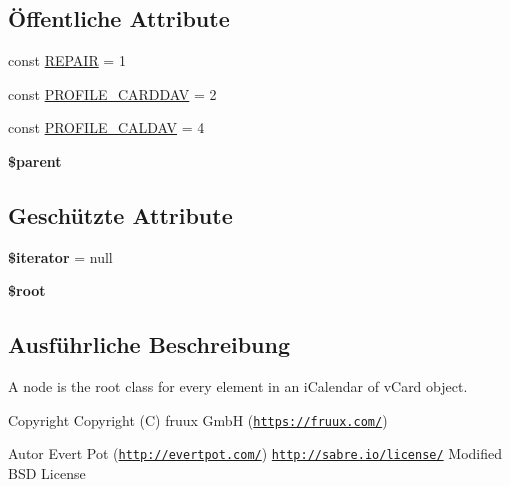 \subsection*{Öffentliche Attribute}
\begin{DoxyCompactItemize}
\item 
const \mbox{\hyperlink{class_sabre_1_1_v_object_1_1_node_ac97a7fb85c1f871523336cd1ec6b29a9}{R\+E\+P\+A\+IR}} = 1
\item 
const \mbox{\hyperlink{class_sabre_1_1_v_object_1_1_node_a0aac3de0b04bcc44bbf0e22ae47a51c3}{P\+R\+O\+F\+I\+L\+E\+\_\+\+C\+A\+R\+D\+D\+AV}} = 2
\item 
const \mbox{\hyperlink{class_sabre_1_1_v_object_1_1_node_a1e68f819b7b5537929290e061ffeacc5}{P\+R\+O\+F\+I\+L\+E\+\_\+\+C\+A\+L\+D\+AV}} = 4
\item 
\mbox{\label{class_sabre_1_1_v_object_1_1_node_ac8c39af4b2dab745f10bb158e92334d4}} 
{\bfseries \$parent}
\end{DoxyCompactItemize}
\subsection*{Geschützte Attribute}
\begin{DoxyCompactItemize}
\item 
\mbox{\label{class_sabre_1_1_v_object_1_1_node_aaab3516a30501994667c5cface8ae395}} 
{\bfseries \$iterator} = null
\item 
\mbox{\label{class_sabre_1_1_v_object_1_1_node_abb98eefc062288640d452f5355f13a08}} 
{\bfseries \$root}
\end{DoxyCompactItemize}


\subsection{Ausführliche Beschreibung}
A node is the root class for every element in an i\+Calendar of v\+Card object.

\begin{DoxyCopyright}{Copyright}
Copyright (C) fruux GmbH (\href{https://fruux.com/}{\tt https\+://fruux.\+com/}) 
\end{DoxyCopyright}
\begin{DoxyAuthor}{Autor}
Evert Pot (\href{http://evertpot.com/}{\tt http\+://evertpot.\+com/})  \href{http://sabre.io/license/}{\tt http\+://sabre.\+io/license/} Modified B\+SD License 
\end{DoxyAuthor}


